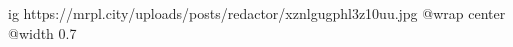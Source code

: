  
 
 
 
 

\ifcmt
  ig https://mrpl.city/uploads/posts/redactor/xznlgugphl3z10uu.jpg
  @wrap center
  @width 0.7
\fi
